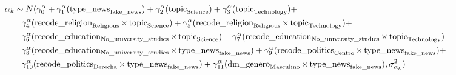 \documentclass{article}
\begin{document}
\begin{equation}
    \begin{split}
    \MoveEqLeft
    \alpha_{k}  \sim N (\gamma_{0}^{\alpha} + \gamma_{1}^{\alpha}(\operatorname{type\_news}_{\operatorname{fake\_news}}) + \gamma_{2}^{\alpha}(\operatorname{topic}_{\operatorname{Science}}) + \gamma_{3}^{\alpha}(\operatorname{topic}_{\operatorname{Technology}}) + \\
    & \gamma_{4}^{\alpha}(\operatorname{recode\_religion}_{\operatorname{Religious}} \times \operatorname{topic}_{\operatorname{Science}}) + \gamma_{5}^{\alpha}(\operatorname{recode\_religion}_{\operatorname{Religious}} \times \operatorname{topic}_{\operatorname{Technology}}) +\\
    & \gamma_{6}^{\alpha}(\operatorname{recode\_education}_{\operatorname{No\_university\_studies}} \times \operatorname{topic}_{\operatorname{Science}}) + \gamma_{7}^{\alpha}(\operatorname{recode\_education}_{\operatorname{No\_university\_studies}} \times \operatorname{topic}_{\operatorname{Technology}}) +\\
    & \gamma_{8}^{\alpha}(\operatorname{recode\_education}_{\operatorname{No\_university\_studies}} \times \operatorname{type\_news}_{\operatorname{fake\_news}}) + \gamma_{9}^{\alpha}(\operatorname{recode\_politics}_{\operatorname{Centro}} \times \operatorname{type\_news}_{\operatorname{fake\_news}}) + \\
    & \gamma_{10}^{\alpha}(\operatorname{recode\_politics}_{\operatorname{Derecha}} \times \operatorname{type\_news}_{\operatorname{fake\_news}}) + \gamma_{11}^{\alpha}(\operatorname{dm\_genero}_{\operatorname{Masculino}} \times \operatorname{type\_news}_{\operatorname{fake\_news}}), \sigma^2_{\alpha_{k}} )
\end{split}
\end{equation}





\end{document}
